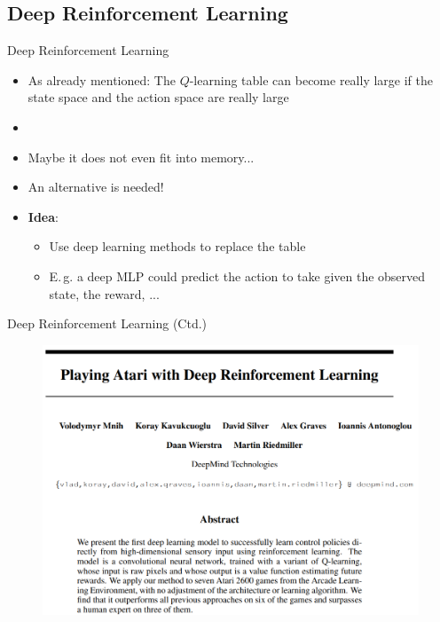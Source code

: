\subsection{Deep Reinforcement Learning}

\begin{frame}{Deep Reinforcement Learning}{}
	\begin{itemize}
		\item As already mentioned: The $Q$-learning table can become really large if the state space and the
			action space are really large
		\item {}
		\item Maybe it does not even fit into memory...
		\item An alternative is needed!
		\item \textbf{Idea}:
		\begin{itemize}
			\item Use deep learning methods to replace the table
			\item E.\,g. a deep MLP could predict the action to take
				given the observed state, the reward, ...
		\end{itemize}
	\end{itemize}
\end{frame}


\begin{frame}{Deep Reinforcement Learning (Ctd.)}{}
	
\end{frame}


\begin{frame}[plain]{}{}
	\begin{figure}
		\centering
		\includegraphics[scale=0.4]{14_rl/02_img/deep_q_learning_paper}
	\end{figure}
\end{frame}


